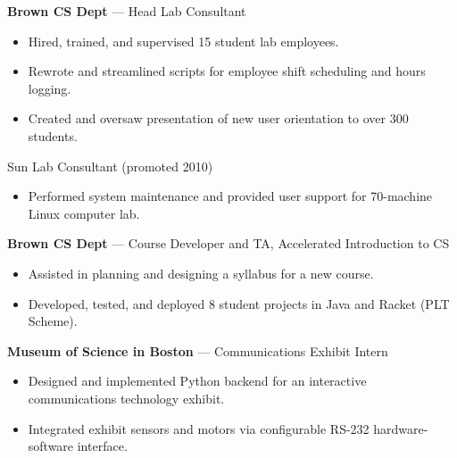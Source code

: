 \documentclass[10pt,letterpaper]{article}
\newcommand{\marginlabel}[1]{\smallskip\noindent{\large{\textsf{\textbf{#1}}}}\smallskip}
\newcommand{\dates}[1]{\item[#1\hfill]}
\newcommand{\jobhead}[3]{{\dates{#1}{\bf #3} --- {#2}}}
\newenvironment{jobs}
  {\leftmargini=24.1mm%
   \begin{list}%
    {}
    {\setlength\labelwidth{22mm}\itemsep=1.5mm}}
  {\end{list}}
\begin{document}
\begin{jobs}
{\jobhead{2010\,--\,2011}{Head Lab Consultant}{Brown CS Dept}
\begin{itemize}
\item Hired, trained, and supervised 15 student lab employees.
\item Rewrote and streamlined scripts for employee shift scheduling and
hours logging.
\item Created and oversaw presentation of new user orientation to over
300 students.
\end{itemize}
\dates{2009\,--\,2010}
 Sun Lab Consultant (promoted 2010)
\begin{itemize}
\item Performed system maintenance and provided user support for
70-machine Linux computer lab.
\end{itemize}

\jobhead{2009}{Course Developer and TA, Accelerated Introduction to CS}
{Brown CS Dept}
\begin{itemize}
\item Assisted in planning and designing a syllabus for a new course.
\item Developed, tested, and deployed 8 student projects in Java and Racket
(PLT Scheme).
\end{itemize}

\jobhead{2008\,--\,2009}{Communications Exhibit Intern}{Museum of Science in
Boston}
\begin{itemize}
\item Designed and implemented Python backend for an interactive
communications technology exhibit.
\item Integrated exhibit sensors and motors via configurable RS-232
hardware-software interface.
\end{itemize}
} %

\end{jobs}

\marginlabel{Education}
\end{document}
